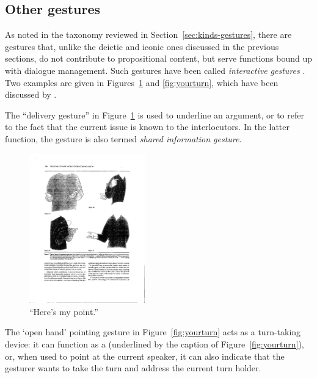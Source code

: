 \documentclass[output=paper
                ,modfonts
                ,nonflat
	        ,collection
	        ,collectionchapter
	        ,collectiontoclongg
 	        ,biblatex
                ,babelshorthands
                ,newtxmath
                ,draftmode
                ,colorlinks, citecolor=brown
]{./langsci/langscibook}
\begin{document}
\subsection{Other gestures}
\label{sec:other-gestures}

As noted in the taxonomy reviewed in Section~\ref{sec:kinds-gestures}, there are gestures that, unlike the deictic and iconic ones discussed in the previous sections, do not contribute to propositional content, but serve functions bound up with dialogue management.
%
Such gestures have been called \emph{interactive gestures} \citep{Bavelas:Chovil:Lawrie:Wade:1992}.
%
Two examples are given in Figures~\ref{fig:mypoint} and \ref{fig:yourturn}, which have been discussed by \citet{Bavelas:Chovil:Coates:Roe:1995}.


The \enquote{delivery gesture}  in Figure~\ref{fig:mypoint} is used to underline an argument, or to refer to the fact that the current issue is known to the interlocutors. 
%
In the latter function, the gesture is also termed \emph{shared information gesture}.

\begin{figure}
  \centering
  \includegraphics[trim={18cm 12cm 6cm 3cm}, clip, angle=90, width=5cm]{figures/InteractiveGestures}
\caption{\enquote{Here's my point.}}
\label{fig:mypoint}
\end{figure}


The \enquote*{open hand} pointing gesture in Figure~\ref{fig:yourturn} acts as a turn-taking device: it can function as a  (underlined by the caption of Figure~\ref{fig:yourturn}), or, when used to point at the current speaker, it can also indicate that the gesturer wants to take the turn and address the current turn holder.
\end{document}
